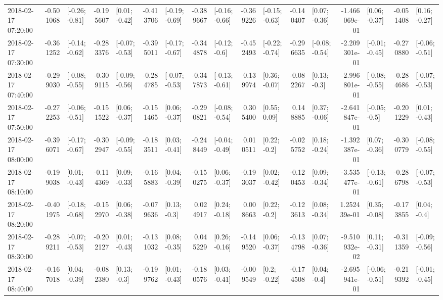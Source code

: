 \begin{tabular}{lrlrlrlrlrlrlrlrl}
2018-02-17 07:20:00 & -0.501068 &  [-0.26; -0.81] & -0.195607 &   [0.01; -0.42] & -0.413706 &  [-0.19; -0.69] & -0.389667 &  [-0.16; -0.66] & -0.369226 &  [-0.15; -0.63] & -0.140407 &   [0.07; -0.36] & -1.466069e-01 &   [0.06; -0.37] & -0.051408 &   [0.16; -0.27] \\
2018-02-17 07:30:00 & -0.361252 &  [-0.14; -0.62] & -0.283376 &  [-0.07; -0.53] & -0.395011 &  [-0.17; -0.67] & -0.344878 &   [-0.12; -0.6] & -0.452493 &  [-0.22; -0.74] & -0.296635 &  [-0.08; -0.54] & -2.209301e-01 &  [-0.01; -0.45] & -0.270880 &  [-0.06; -0.51] \\
2018-02-17 07:40:00 & -0.299030 &  [-0.08; -0.55] & -0.309115 &  [-0.09; -0.56] & -0.284785 &  [-0.07; -0.53] & -0.347873 &  [-0.13; -0.61] &  0.139974 &   [0.36; -0.07] & -0.082267 &    [0.13; -0.3] & -2.996801e-01 &  [-0.08; -0.55] & -0.284686 &  [-0.07; -0.53] \\
2018-02-17 07:50:00 & -0.272253 &  [-0.06; -0.51] & -0.151522 &   [0.06; -0.37] & -0.151465 &   [0.06; -0.37] & -0.290821 &  [-0.08; -0.54] &  0.305400 &    [0.55; 0.09] &  0.148885 &   [0.37; -0.06] & -2.641847e-01 &   [-0.05; -0.5] & -0.201229 &   [0.01; -0.43] \\
2018-02-17 08:00:00 & -0.396071 &  [-0.17; -0.67] & -0.302947 &  [-0.09; -0.55] & -0.183511 &   [0.03; -0.41] & -0.248449 &  [-0.04; -0.49] &  0.010511 &    [0.22; -0.2] & -0.025752 &   [0.18; -0.24] & -1.392387e-01 &   [0.07; -0.36] & -0.300779 &  [-0.08; -0.55] \\
2018-02-17 08:10:00 & -0.199038 &   [0.01; -0.43] & -0.114369 &   [0.09; -0.33] & -0.165883 &   [0.04; -0.39] & -0.150275 &   [0.06; -0.37] & -0.193037 &   [0.02; -0.42] & -0.120453 &   [0.09; -0.34] & -3.535477e-01 &  [-0.13; -0.61] & -0.286798 &  [-0.07; -0.53] \\
2018-02-17 08:20:00 & -0.401975 &  [-0.18; -0.68] & -0.152970 &   [0.06; -0.38] & -0.079636 &    [0.13; -0.3] &  0.024917 &   [0.24; -0.18] &  0.008663 &    [0.22; -0.2] & -0.123613 &   [0.08; -0.34] &  1.252439e-01 &   [0.35; -0.08] & -0.173855 &    [0.04; -0.4] \\
2018-02-17 08:30:00 & -0.289211 &  [-0.07; -0.53] & -0.202127 &   [0.01; -0.43] & -0.131032 &   [0.08; -0.35] &  0.045229 &   [0.26; -0.16] & -0.149520 &   [0.06; -0.37] & -0.134798 &   [0.07; -0.36] & -9.510932e-02 &   [0.11; -0.31] & -0.311359 &  [-0.09; -0.56] \\
2018-02-17 08:40:00 & -0.167018 &   [0.04; -0.39] & -0.082380 &    [0.13; -0.3] & -0.199762 &   [0.01; -0.43] & -0.180576 &   [0.03; -0.41] & -0.009549 &    [0.2; -0.22] & -0.174508 &    [0.04; -0.4] & -2.695941e-01 &  [-0.06; -0.51] & -0.219392 &  [-0.01; -0.45] \\

\end{tabular}
